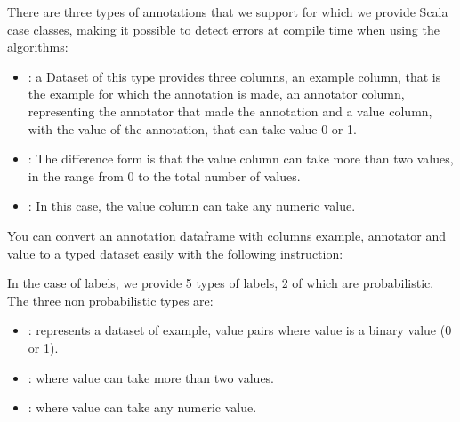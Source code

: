 \documentclass[letterpaper,10pt,english]{sphinxmanual}
\begin{document}
There are three types of annotations that we support for which we provide Scala case classes,
making it possible to detect errors at compile time when using the algorithms:
\begin{itemize}
\item {} 
: a Dataset of this type provides three columns, an example column, that
is the example for which the annotation is made, an annotator column, representing the
annotator that made the annotation and a value column, with the value of the annotation, that
can take value 0 or 1.

\item {} 
: The difference form  is that the value column can
take more than two values, in the range from 0 to the total number of values.

\item {} 
: In this case, the value column can take any numeric value.

\end{itemize}

You can convert an annotation dataframe with columns example, annotator and value to a
typed dataset easily with the following instruction:

%
\begin{sphinxVerbatim}[commandchars=\\\{\}]
   \PYG{o}{[}\PYG{o}{]}
\end{sphinxVerbatim}

In the case of labels, we provide 5 types of labels, 2 of which are probabilistic. The three non probabilistic
types are:
\begin{itemize}
\item {} 
: represents a dataset of example, value pairs where value is a binary value (0 or 1).

\item {} 
: where value can take more than two values.

\item {} 
: where value can take any numeric value.

\end{itemize}
\end{document}

